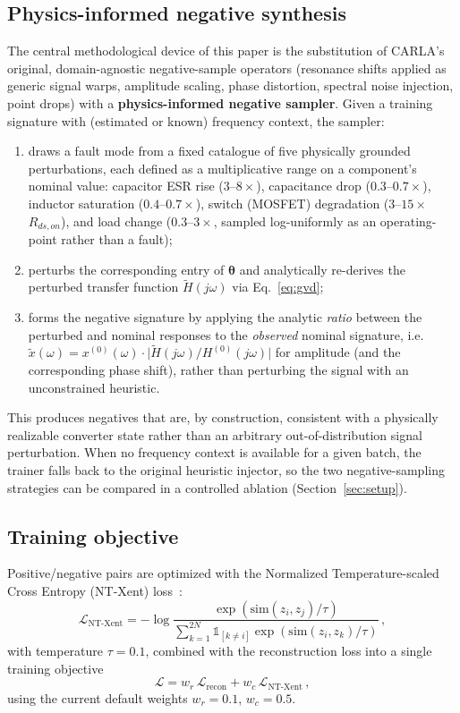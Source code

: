\documentclass[11pt,a4paper]{article}
\begin{document}
\subsection{Physics-informed negative synthesis}
\label{sec:physics-negatives}
The central methodological device of this paper is the substitution of CARLA's original,
domain-agnostic negative-sample operators (resonance shifts applied as generic signal
warps, amplitude scaling, phase distortion, spectral noise injection, point drops) with a
\textbf{physics-informed negative sampler}. Given a training signature with (estimated or
known) frequency context, the sampler:
\begin{enumerate}
    \item draws a fault mode from a fixed catalogue of five physically grounded
    perturbations, each defined as a multiplicative range on a component's nominal value:
    capacitor ESR rise ($3$--$8\times$), capacitance drop ($0.3$--$0.7\times$), inductor
    saturation ($0.4$--$0.7\times$), switch (MOSFET) degradation ($3$--$15\times$
    $R_{ds,on}$), and load change ($0.3$--$3\times$, sampled log-uniformly as an
    operating-point rather than a fault);
    \item perturbs the corresponding entry of $\boldsymbol\theta$ and analytically
    re-derives the perturbed transfer function $\tilde H(j\omega)$ via
    Eq.~\eqref{eq:gvd};
    \item forms the negative signature by applying the analytic \emph{ratio} between the
    perturbed and nominal responses to the \emph{observed} nominal signature, i.e.
    $\tilde x(\omega) = x^{(0)}(\omega)\cdot \big|\tilde H(j\omega)\big/H^{(0)}(j\omega)\big|$
    for amplitude (and the corresponding phase shift), rather than perturbing the signal
    with an unconstrained heuristic.
\end{enumerate}
This produces negatives that are, by construction, consistent with a physically
realizable converter state rather than an arbitrary out-of-distribution signal
perturbation. When no frequency context is available for a given batch, the trainer falls
back to the original heuristic injector, so the two negative-sampling strategies can be
compared in a controlled ablation (Section~\ref{sec:setup}).

\subsection{Training objective}
\label{sec:objective}
Positive/negative pairs are optimized with the Normalized Temperature-scaled Cross
Entropy (NT-Xent) loss~\cite{chen2020simclr,darban2023carla}:
\begin{equation}
\mathcal L_{\text{NT-Xent}} = -\log \frac{\exp(\mathrm{sim}(z_i,z_j)/\tau)}{\sum_{k=1}^{2N}\mathbb 1_{[k\neq i]}\exp(\mathrm{sim}(z_i,z_k)/\tau)}\,,
\label{eq:ntxent}
\end{equation}
with temperature $\tau=0.1$, combined with the reconstruction loss into a single training
objective
\begin{equation}
\mathcal L = w_r\,\mathcal L_{\text{recon}} + w_c\,\mathcal L_{\text{NT-Xent}}\,,
\label{eq:combined-loss}
\end{equation}
using the current default weights $w_r=0.1$, $w_c=0.5$.
\end{document}
